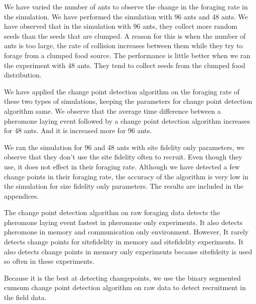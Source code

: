 We have varied the number of ants to observe the change in the foraging rate in the simulation. We have performed the simulation with 96 ants and 48 ants. We have observed that in the simulation with 96 ants, they collect more random seeds than the seeds that are clumped. A reason for this is when the number of ants is too large, the rate of collision increases between them while they try to forage from a clumped food source. The performance is little better when we ran the experiment with 48 ants. They tend to collect seeds from the clumped food distribution. \par

We have applied the change point detection algorithm on the foraging rate of these two types of simulations, keeping the parameters for change point detection algorithm same. We observe that the average time difference between a pheromone laying event followed by a change point detection algorithm increases for 48 ants. And it is increased more for 96 ants. \par

We ran the simulation for 96 and 48 ants with site fidelity only parameters, we observe that they don't use the site fidelity often to recruit. Even though they use, it does not effect in their foraging rate. Although we have detected a few change points in their foraging rate, the accuracy of the algorithm is very low in the simulation for size fidelity only parameters. The results are included in the appendices. \par
The change point detection algorithm on raw foraging data detects the pheromone laying event fastest in pheromone only experiments. It also detects pheromone in memory and communication only environment. However, It rarely detects change points for sitefidelity in memory and sitefidelity experiments. It also detects change points in memory only experiments because sitefideity is used so often in these experiments. \par
Because it is the best at detecting changepoints, we use the binary segmented cumsum change point detection algorithm on raw data to detect recruitment in the field data. 
 
